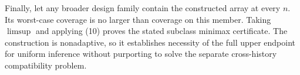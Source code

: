 Finally, let any broader design family contain the constructed array at every \(n\). Its worst-case coverage is no larger than coverage on this member. Taking \(\limsup\) and applying (10) proves the stated subclass minimax certificate. The construction is nonadaptive, so it establishes necessity of the full upper endpoint for uniform inference without purporting to solve the separate cross-history compatibility problem.